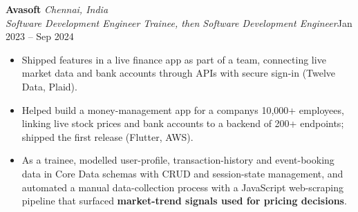 \documentclass[a4paper,11pt]{article}
\newcommand{\role}[4]{%
  \textbf{#1}{\color{muted}\,\textperiodcentered\,\textit{#2}}\\
  \textit{#4}\hfill{\color{muted}#3}\par}
\newcommand{\gap}{\vspace{5pt}}
\newcommand{\num}[1]{\textbf{#1}}   %
\begin{document}
\gap
{}
\role{Avasoft}{Chennai, India}{Jan 2023 – Sep 2024}{Software Development Engineer Trainee, then Software Development Engineer}
\begin{itemize}
  \item Shipped features in a live finance app as part of a team, connecting live market data and bank accounts through APIs with secure sign-in (Twelve Data, Plaid).
  \item Helped build a money-management app for a company\textquotesingle{}s 10,000+ employees, linking live stock prices and bank accounts to a backend of 200+ endpoints; shipped the first release (Flutter, AWS).
  \item As a trainee, modelled user-profile, transaction-history and event-booking data in Core Data schemas with CRUD and session-state management, and automated a manual data-collection process with a JavaScript web-scraping pipeline that surfaced \num{market-trend signals used for pricing decisions}.
\end{itemize}
\end{document}
